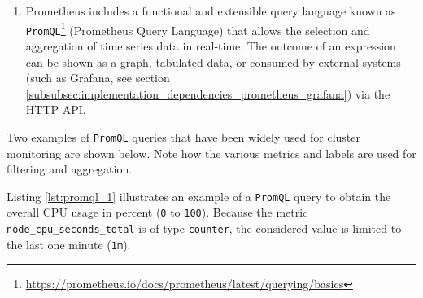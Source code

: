 \begin{enumerate}
\begin{enumerate}
\begin{enumerate}
          \item \texttt{Histogram}\footnote{\url{https://prometheus.io/docs/concepts/metric_types/\#histogram}}
            \newline
            Samples and counts observations in variable buckets, providing also the
            total sum of all observed values.

          \item \texttt{Summary}\footnote{\url{https://prometheus.io/docs/concepts/metric_types/\#summary}}
            \newline
            Similar to \texttt{Histogram} type, it also calculates configurable
            quantiles over a time window.
        \end{enumerate}

      \item \texttt{Labels}
        \newline
        Labels allow Prometheus' dimensional data model: each given combination
        of labels for the same metric name identifies a unique dimensional
        instantiation of that metric. These dimensions can be used to filter and
        aggregate data by the \texttt{PromQL} query language.
        \newline
        For example, \lstinline[language=prometheus, alsoletter={_},
        morekeywords={node_cpu_seconds_total}, morekeywords={[2]{cpu, mode}}]|node_cpu_seconds_total{cpu="0",mode="idle"}|,
        determines the number of seconds spent in idle mode by CPU core 0.
    \end{enumerate}

  \item Prometheus includes a functional and extensible query language known as \texttt{PromQL}\footnote{\url{https://prometheus.io/docs/prometheus/latest/querying/basics}}
    (Prometheus Query Language) that allows the selection and aggregation of
    time series data in real-time. The outcome of an expression can be shown as a
    graph, tabulated data, or consumed by external systems (such as Grafana, see
    section \ref{subsubsec:implementation_dependencies_prometheus_grafana}) via
    the HTTP API.
\end{enumerate}

Two examples of \texttt{PromQL} queries that have been widely used for cluster
monitoring are shown below. Note how the various metrics and labels are used for
filtering and aggregation.

Listing \ref{lst:promql_1} illustrates an example of a \texttt{PromQL} query to
obtain the overall CPU usage in percent (\texttt{0} to \texttt{100}). Because the
metric \lstinline[language=prometheus, alsoletter={_}, morekeywords={node_cpu_seconds_total}]{node_cpu_seconds_total}
is of type \texttt{counter}, the considered value is limited to the last one minute
(\texttt{1m}).

